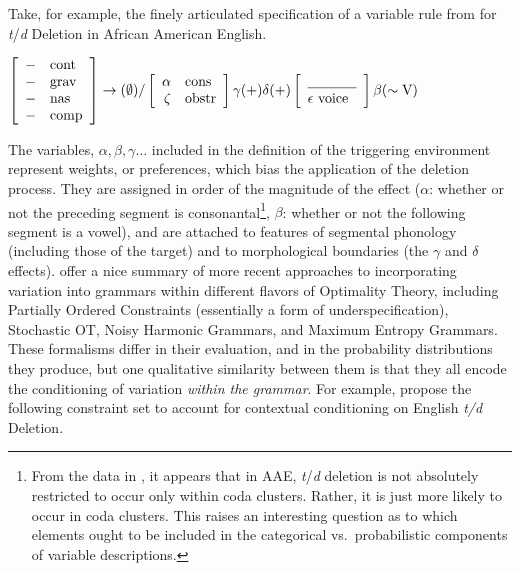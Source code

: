 Take, for example, the finely articulated specification of a variable rule from \citet{3288} for {\sl t}/{\sl d} Deletion in African American English.
\begin{exe}
 \ex $\left[\begin{array}{rl}
	-&\mbox{cont}\\
	-&\mbox{grav}\\
	-&\mbox{nas}\\
	-&\mbox{comp}
\end{array}\right] \rightarrow (\emptyset) / 
\left[
	\begin{array}{rl}
		\alpha & \mbox{cons}\\
		\zeta &  \mbox{obstr}
	\end{array}
\right]\gamma(\mbox{+})\delta(\mbox{+})
\left[
	\begin{array}{l}
	\underline{\hskip 35pt}\\
	\epsilon~\mbox{voice}
	\end{array}
\right]
\beta(\sim \mbox{V})$ \label{variable.rule}
\end{exe}
The variables, $\alpha, \beta, \gamma \ldots$ included in the definition of the triggering environment represent weights, or preferences, which bias the application of the deletion process. 
They are assigned in order of the magnitude of the effect ($\alpha$: whether or not the preceding segment is consonantal\footnote{From the data in \citet{3288}, it appears that in AAE, {\sl t}/{\sl d} deletion is not absolutely restricted to occur only within coda clusters.
Rather, it is just more likely to occur in coda clusters.
This raises an interesting question as to which elements ought to be included in the categorical vs.\ probabilistic components of variable descriptions.},
$\beta$: whether or not the following segment is a vowel), and are attached to features of segmental phonology (including those of the target) and to morphological boundaries (the $\gamma$ and $\delta$ effects).
\citet{Coetzee2011} offer a nice summary of more recent approaches to incorporating variation into grammars within different flavors of Optimality Theory, including Partially Ordered Constraints (essentially a form of underspecification), Stochastic OT, Noisy Harmonic Grammars, and Maximum Entropy Grammars.
These formalisms differ in their evaluation, and in the probability distributions they produce, but one qualitative similarity between them is that they all encode the conditioning of variation \emph{within the grammar}. 
For example, \citet{Coetzee2012} propose the following constraint set to account for contextual conditioning on English {\it t/d} Deletion.
